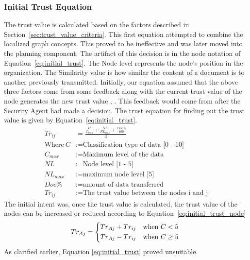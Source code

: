 \subsubsection{Initial Trust Equation}
\label{sec:initial_trust_equation}
The trust value is calculated based on the factors described in
Section~\ref{sec:trust_value_criteria}. This first equation attempted to combine
the localized graph concepts. This
proved to be ineffective and was later moved into the planning component. The
artifact of this decision is in the node notation of
Equation~\ref{eq:initial_trust}. 
The Node level represents the node's
position in the organization. The Similarity value is how similar the content of
a document is to another previously transmitted.  Initially, our equation
assumed that the above three factors come from some
feedback along with the current trust value of the node generates the new trust
value \autocite{L.Xiong2004}, \autocite{YanWang2007}. This feedback would come
from after the Security Agent had made a decision. The trust equation for
finding out the trust value is given by Equation~\ref{eq:initial_trust}.
\begin{equation}
    \begin{aligned}
         Tr_{ij}&=\frac{\frac{C}{C_{max}} + \frac{NL}{NL_{max}} + \frac{Doc\%}{100}}{3} \\
    \text{Where}~C &:= \text{Classification type of data [0 - 10]} \\
C_{max} &:= \text{Maximum level of the data} \\
NL &:= \text{Node level [1 - 5]} \\
NL_{max} &:= \text{maximum node level [5]} \\
Doc\% &:= \text{amount of data transferred} \\
Tr_{ij} &:= \text{The trust value between the nodes i and j}
    \label{eq:initial_trust}
\end{aligned}
\end{equation}
The initial intent was, once the trust value is calculated, the trust
value of the nodes can be increased or reduced according to
Equation~\ref{eq:initial_trust_node}
\begin{equation}
   Tr_{Aj} =    \begin{dcases*}
                    Tr_{Aj} + Tr_{ij} & when $C < 5$\\
                    Tr_{Aj} - Tr_{ij} & when $C \ge 5$
                \end{dcases*}
                \label{eq:initial_trust_node}
\end{equation}
As clarified earlier, Equation \ref{eq:initial_trust} proved unsuitable.

